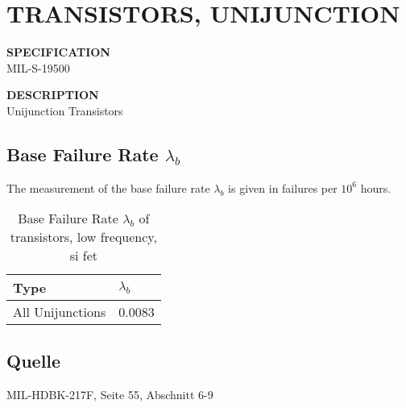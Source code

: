 \section{TRANSISTORS, UNIJUNCTION}

\begin{minipage}[t]{0.29\textwidth}
    \textbf{SPECIFICATION}\\
    MIL-S-19500
\end{minipage}
\begin{minipage}[t]{0.7\textwidth}
    \textbf{DESCRIPTION}\\
    {\fontsize{12pt}{12pt}\selectfont Unijunction Transistors}
\end{minipage}

\subsection{Base Failure Rate $\lambda_b$}
The measurement of the base failure rate $\lambda_b$ is given in failures per $10^6$ hours.
\begin{table}[ht]
{\centering

\begin{tabular}{|p{7.5cm}|p{5cm}|}
    \hline
    \textbf{Type} & \textbf{$\lambda_b$} \\
    \hline
    All Unijunctions & 0.0083 \\
    \hline
\end{tabular}

\caption{Base Failure Rate $\lambda_b$ of transistors, low frequency, si fet}

\label{tab:bfr_transistors_unijucntion}
\par}
\subsection*{Quelle}
MIL-HDBK-217F, Seite 55, Abschnitt 6-9
\end{table}